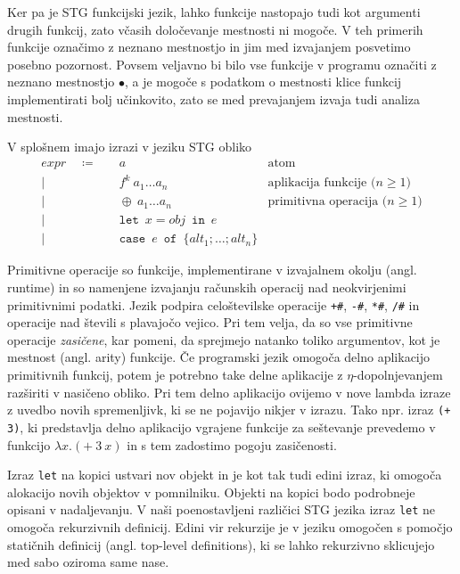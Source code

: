 Ker pa je STG funkcijski jezik, lahko funkcije nastopajo tudi kot argumenti drugih funkcij, zato včasih določevanje mestnosti ni mogoče. V teh primerih funkcije označimo z neznano mestnostjo in jim med izvajanjem posvetimo posebno pozornost. Povsem veljavno bi bilo vse funkcije v programu označiti z neznano mestnostjo $\bullet$, a je mogoče s podatkom o mestnosti klice funkcij implementirati bolj učinkovito, zato se med prevajanjem izvaja tudi analiza mestnosti.

V splošnem imajo izrazi v jeziku STG obliko
\begin{align*}
	expr \quad \coloneq& \quad a & \text{atom}\\
	\vert& \quad f^k \: a_1 \dots a_n & \text{aplikacija funkcije ($n \geq 1$)}\\
	\vert& \quad \oplus \: a_1 \dots a_n & \text{primitivna operacija ($n \geq 1$)}\\
	\vert& \quad \texttt{let} \enspace x = obj \enspace \texttt{in} \enspace e & \text{} \\
	\vert& \quad \texttt{case} \enspace e \enspace \texttt{of} \enspace \{ alt_1; \dots; alt_n \}& \text{}
\end{align*}

Primitivne operacije so funkcije, implementirane v izvajalnem okolju (angl. runtime) in so namenjene izvajanju računskih operacij nad neokvirjenimi primitivnimi podatki. Jezik podpira celoštevilske operacije \texttt{+\#}, \texttt{-\#}, \texttt{*\#}, \texttt{/\#} in operacije nad števili s plavajočo vejico. Pri tem velja, da so vse primitivne operacije \textit{zasičene}, kar pomeni, da sprejmejo natanko toliko argumentov, kot je mestnost (angl. arity) funkcije. Če programski jezik omogoča delno aplikacijo primitivnih funkcij, potem je potrebno take delne aplikacije z $\eta$-dopolnjevanjem razširiti v nasičeno obliko. Pri tem delno aplikacijo ovijemo v nove lambda izraze z uvedbo novih spremenljivk, ki se ne pojavijo nikjer v izrazu. Tako npr. izraz \texttt{(+ 3)}, ki predstavlja delno aplikacijo vgrajene funkcije za seštevanje prevedemo v funkcijo $\lambda x . (+ \: 3 \: x)$ in s tem zadostimo pogoju zasičenosti.

Izraz \texttt{let} na kopici ustvari nov objekt in je kot tak tudi edini izraz, ki omogoča alokacijo novih objektov v pomnilniku. Objekti na kopici bodo podrobneje opisani v nadaljevanju. V naši poenostavljeni različici STG jezika izraz \texttt{let} ne omogoča rekurzivnih definicij. Edini vir rekurzije je v jeziku omogočen s pomočjo statičnih definicij (angl. top-level definitions), ki se lahko rekurzivno sklicujejo med sabo oziroma same nase.

